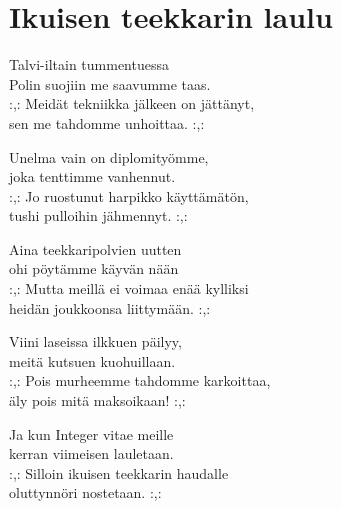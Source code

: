 \section*{\hfill Ikuisen teekkarin laulu \hfill}

Talvi-iltain tummentuessa\\
Polin suojiin me saavumme taas.\\ 
:,: Meidät tekniikka jälkeen on jättänyt,\\
sen me tahdomme unhoittaa. :,:

Unelma vain on diplomityömme,\\
joka tenttimme vanhennut.\\
:,: Jo ruostunut harpikko käyttämätön,\\
tushi pulloihin jähmennyt. :,:

Aina teekkaripolvien uutten\\ 
ohi pöytämme käyvän nään\\
:,: Mutta meillä ei voimaa enää kylliksi\\
heidän joukkoonsa liittymään. :,:

Viini laseissa ilkkuen päilyy,\\
meitä kutsuen kuohuillaan. \\
:,: Pois murheemme tahdomme karkoittaa,\\
äly pois mitä maksoikaan! :,: 

Ja kun Integer vitae meille\\
kerran viimeisen lauletaan. \\
:,: Silloin ikuisen teekkarin haudalle\\ oluttynnöri nostetaan. :,: 